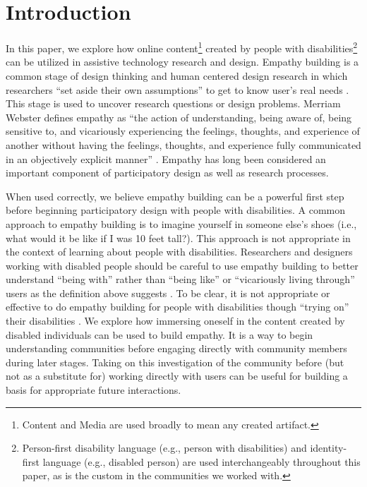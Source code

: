 \section{Introduction}
In this paper, we explore how online content\footnote{Content and Media are used broadly to mean any created artifact.} created by people with disabilities\footnote{Person-first disability language (e.g., person with disabilities) and identity-first language (e.g., disabled person) are used interchangeably throughout this paper, as is the custom in the communities we worked with.} can be utilized in assistive technology research and design. Empathy building is a common stage of design thinking and human centered design research in which researchers ``set aside their own assumptions'' to get to know user's real needs \cite{plattnerDesignThinkingUnderstand2011,wrightEmpathyExperienceHCI2008}. This stage is used to uncover research questions or design problems. Merriam Webster defines empathy as ``the action of understanding, being aware of, being sensitive to, and vicariously experiencing the feelings, thoughts, and experience of another without having the feelings, thoughts, and experience fully communicated in an objectively explicit manner'' \cite{inc.MeriamWebsterDictionaryDefinition2004}. Empathy has long been considered an important component of participatory design as well as research processes. %

When used correctly, we believe empathy building can be a powerful first step before beginning participatory design with people with disabilities. A common approach to empathy building is to imagine yourself in someone else's shoes (i.e., what would it be like if I was 10 feet tall?). This approach is not appropriate in the context of learning about people with disabilities. Researchers and designers working with disabled people should be careful to use empathy building to better understand ``being with'' rather than ``being like'' or ``vicariously living through'' users as the definition above suggests \cite{bennettPromiseEmpathyDesign2019}. To be clear, it is not appropriate or effective to do empathy building for people with disabilities though ``trying on'' their disabilities \cite{abreuWhyWonTry2018}.  
We explore how immersing oneself in the content created by disabled individuals can be used to build empathy. It is a way to begin understanding communities before engaging directly with community members during later stages. Taking on this investigation of the community before (but not as a substitute for) working directly with users can be useful for building a basis for appropriate future interactions. 

